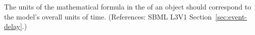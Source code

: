 The units of the mathematical formula in the \Delay of an \Event object
should correspond to the model's overall units of time.  (References: SBML
L3V1 Section~\ref{sec:event-delay}.)
